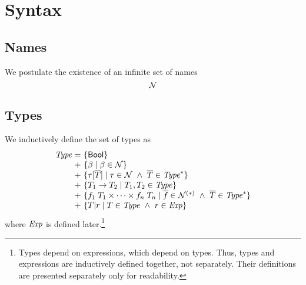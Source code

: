 \section{Syntax}
\label{syntax}

\subsection{Names}

We postulate the existence of an infinite set of names
\[
\mathcal{N}
\]

\subsection{Types}

We inductively define the set of types as
\[
\setdefVI
 {\Typ}
 {+}
 {\setI{\bool}}
 {\setST{\tvar}{\tvar\in\Nam}}
 {\setST{\tinstO}{\tnam\in\Nam\AND\typS\in\Seq{\Typ}}}
 {\setST{\tarr{\typ_1}{\typ_2}}{\typ_1,\typ_2\in\Typ}}
 {\setST{\trecFTO}{\fnamS\in\SeqNR{\Nam}\AND\typS\in\Seq{\Typ}}}
 {\setST{\tsubO}{\typ\in\Typ\AND\tspred\in\Expr}}
\]
where $\mathit{Exp}$ is defined later.\footnote{Types depend on expressions, which
depend on types. Thus, types and expressions are inductively defined together,
not separately. Their definitions are presented separately only for
readability.}

